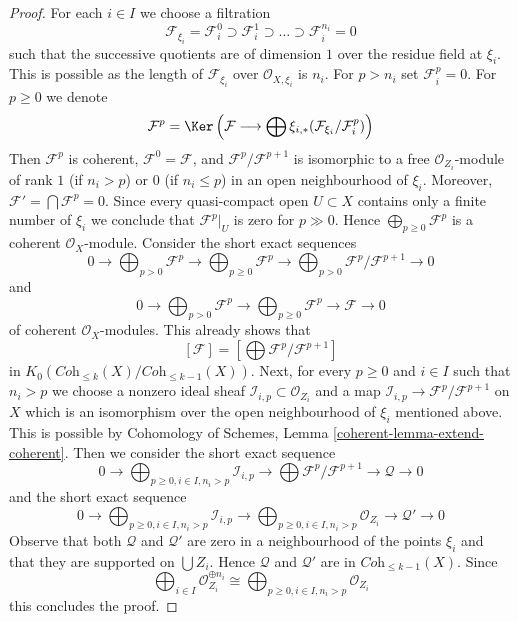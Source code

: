 \begin{proof}
\medskip\noindent
For each $i \in I$ we choose a filtration
$$
\mathcal{F}_{\xi_i} = \mathcal{F}_i^0 \supset \mathcal{F}_i^1 \supset
\ldots \supset \mathcal{F}_i^{n_i} = 0
$$
such that the successive quotients are of dimension $1$ over the residue
field at $\xi_i$. This is possible as the length of $\mathcal{F}_{\xi_i}$
over $\mathcal{O}_{X, \xi_i}$ is $n_i$.
For $p > n_i$ set $\mathcal{F}_i^p = 0$. For $p \geq 0$ we denote
$$
\mathcal{F}^p =
\Ker\left(\mathcal{F} \longrightarrow \bigoplus
\xi_{i, *}(\mathcal{F}_{\xi_i}/\mathcal{F}_i^p)\right)
$$
Then $\mathcal{F}^p$ is coherent, $\mathcal{F}^0 = \mathcal{F}$, and
$\mathcal{F}^p/\mathcal{F}^{p + 1}$ is isomorphic to a free
$\mathcal{O}_{Z_i}$-module of rank $1$ (if $n_i > p$) or $0$
(if $n_i \leq p$) in an open neighbourhood of $\xi_i$. Moreover,
$\mathcal{F}' = \bigcap \mathcal{F}^p = 0$. Since every quasi-compact
open $U \subset X$ contains only a finite number of $\xi_i$
we conclude that $\mathcal{F}^p|_U$ is zero for $p \gg 0$.
Hence $\bigoplus_{p \geq 0} \mathcal{F}^p$ is a coherent
$\mathcal{O}_X$-module. Consider the short exact sequences
$$
0 \to
\bigoplus\nolimits_{p > 0} \mathcal{F}^p \to
\bigoplus\nolimits_{p \geq 0} \mathcal{F}^p \to
\bigoplus\nolimits_{p > 0} \mathcal{F}^p/\mathcal{F}^{p + 1} \to 0
$$
and
$$
0 \to
\bigoplus\nolimits_{p > 0} \mathcal{F}^p \to
\bigoplus\nolimits_{p \geq 0} \mathcal{F}^p \to
\mathcal{F} \to 0
$$
of coherent $\mathcal{O}_X$-modules. This already shows that
$$
[\mathcal{F}] = [\bigoplus \mathcal{F}^p/\mathcal{F}^{p + 1}]
$$
in $K_0(\textit{Coh}_{\leq k}(X)/\textit{Coh}_{\leq k - 1}(X))$.
Next, for every $p \geq 0$ and $i \in I$ such that $n_i > p$
we choose a nonzero ideal sheaf $\mathcal{I}_{i, p} \subset \mathcal{O}_{Z_i}$
and a map $\mathcal{I}_{i, p} \to \mathcal{F}^p/\mathcal{F}^{p + 1}$ on $X$
which is an isomorphism over the open neighbourhood of $\xi_i$
mentioned above. This is possible by
Cohomology of Schemes, Lemma \ref{coherent-lemma-extend-coherent}.
Then we consider the short exact sequence
$$
0 \to
\bigoplus\nolimits_{p \geq 0, i \in I, n_i > p} \mathcal{I}_{i, p}
\to
\bigoplus \mathcal{F}^p/\mathcal{F}^{p + 1} \to
\mathcal{Q} \to 0
$$
and the short exact sequence
$$
0 \to
\bigoplus\nolimits_{p \geq 0, i \in I, n_i > p} \mathcal{I}_{i, p}
\to
\bigoplus\nolimits_{p \geq 0, i \in I, n_i > p} \mathcal{O}_{Z_i}
\to
\mathcal{Q}' \to 0
$$
Observe that both $\mathcal{Q}$ and $\mathcal{Q}'$ are zero in a neighbourhood
of the points $\xi_i$ and that they are supported on $\bigcup Z_i$.
Hence $\mathcal{Q}$ and $\mathcal{Q}'$ are in
$\textit{Coh}_{\leq k - 1}(X)$.
Since
$$
\bigoplus\nolimits_{i \in I} \mathcal{O}_{Z_i}^{\oplus n_i} \cong
\bigoplus\nolimits_{p \geq 0, i \in I, n_i > p} \mathcal{O}_{Z_i}
$$
this concludes the proof.
\end{proof}

